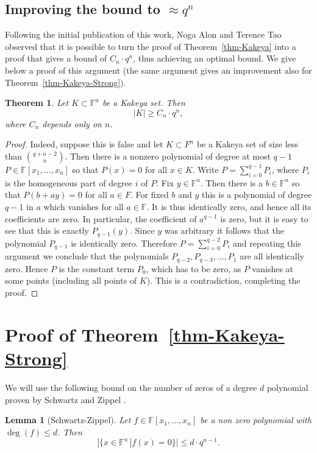 \documentclass[12pt]{article}
\newtheorem{lem}[thm]{Lemma}
\newtheorem{THM}{Theorem}
\def\F{{\mathbb{F}}}
\begin{document}
\subsection{Improving the bound to $\approx q^n$}
Following the initial publication of this work, Noga Alon and
Terence Tao \cite{AT08} observed that it is possible to turn the
proof of Theorem~\ref{thm-Kakeya} into a proof that gives a bound
of $C_n \cdot q^n$, thus achieving an optimal bound. We give below
a proof of this argument (the same argument gives an improvement
also for Theorem~\ref{thm-Kakeya-Strong}).
\begin{THM}
Let $K \subset \F^n$ be a Kakeya set. Then
\[ |K| \geq C_n \cdot q^{n}, \]
where $C_n$ depends only on $n$.
\end{THM}
\begin{proof}
Indeed, suppose this is false and let $K \subset F^n$ be a Kakeya
set of size less than ${{q+n-2} \choose {n}}$. Then there is a
nonzero polynomial of degree at most $q-1$ $P \in \F[x_1, \ldots
,x_n]$ so that $P(x)=0$ for all $x \in K$. Write
$P=\sum_{i=0}^{q-1}P_i$, where $P_i$ is the homogeneous part of
degree  $i$ of $P$. Fix $ y \in \F^n$. Then there is a $b \in
\F^n$ so that $P(b+ay)=0$ for all $a \in F$. For fixed $b$ and $y$
this is a polynomial of degree $q-1$ in $a$ which vanishes for all
$a \in \F$. It is thus identically zero, and hence all its
coefficients are zero. In particular, the coefficient of $a^{q-1}$
is zero, but it is easy to see that this is exactly $P_{q-1}(y)$.
Since $y$ was arbitrary it follows that the polynomial $P_{q-1}$
is identically zero. Therefore $P=\sum_{i=0}^{q-2} P_i$ and
repeating this argument we conclude that the polynomials
$P_{q-2},P_{q-3}, \ldots ,P_1$ are all identically zero. Hence $P$
is the constant term $P_0$, which has to be zero, as $P$ vanishes
at some points (including all points of $K$). This is a
contradiction, completing the proof.
\end{proof}





\section{Proof of Theorem~\ref{thm-Kakeya-Strong}}\label{sec-Kakeya-Proof}
We will use the following bound on the number of zeros of a degree
$d$ polynomial proven by Schwartz and Zippel
\cite{Schwartz80,Zippel79}.
\begin{lem}[Schwartz-Zippel]\label{lem-SZ}
Let $f \in \F[x_1,\ldots,x_n]$ be a non zero polynomial with
$\deg(f) \leq d$. Then
\[ |\{ x \in \F^n \,| f(x)=0 \}| \leq d \cdot q^{n-1}. \]
\end{lem}
\end{document}
